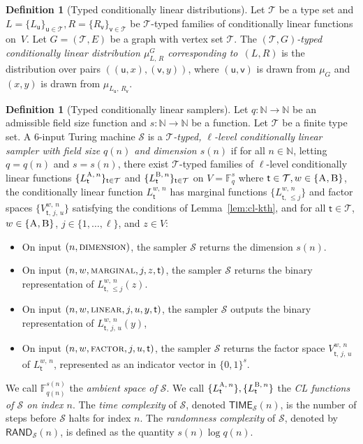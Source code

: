 \documentclass[11pt]{article}
\theoremstyle{definition}
\newtheorem{definition}[theorem]{Definition}
\newcommand{\N}{\ensuremath{\mathbb{N}}}
\newcommand{\F}{\ensuremath{\mathbb{F}}}
\newcommand{\sampler}{\mathcal{S}}
\newcommand{\type}{\mathcal{T}}
\newcommand{\gamestyle}[1]{\ensuremath{\textsc{#1}}\xspace}
\newcommand{\labelstyle}[1]{\ensuremath{\textsc{#1}}\xspace}
\newcommand{\tvarstyle}[1]{\mathsf{#1}}
\newcommand{\tvar}{\ensuremath{\tvarstyle{t}}}
\newcommand{\lvar}{\ensuremath{\tvarstyle{u}}}
\newcommand{\rvar}{\ensuremath{\tvarstyle{v}}}
\newcommand{\alice}{\labelstyle{A}}
\newcommand{\bob}{\labelstyle{B}}
\newcommand{\ab}{\{\alice, \bob\}}
\newcommand{\AB}{\{\alice, \bob\}}
\newcommand{\TIME}{\mathsf{TIME}}
\newcommand{\RAND}{\mathsf{RAND}}
\begin{document}
\begin{definition}[Typed conditionally linear distributions]
  Let $\type$ be a type set and
  $L=\{L_\lvar\}_{\lvar\in\type},R=\{R_\rvar\}_{\rvar\in\type}$ be $\type$-typed
  families of conditionally linear functions on~$V$.
  Let $G = (\type, E)$ be a graph with vertex set $\type$.
  The \emph{$(\type, G)$-typed conditionally linear distribution $\mu_{L,\,
      R}^G$ corresponding to~$(L, R)$} is the distribution over pairs $( (\lvar,
  x), (\rvar, y) )$, where $(\lvar, \rvar)$ is drawn from $\mu_G$ and $(x,y)$ is
  drawn from $\mu_{L_\lvar,\, R_\rvar}$.
\end{definition}

\begin{definition}[Typed conditionally linear samplers]
  \label{def:typed-sampler}
	Let $q:\N \to \N$ be an admissible field size function and $s: \N \to \N$ be a
  function.
  Let $\type$ be a finite type set.
  A $6$-input Turing machine $\sampler$ is a \emph{$\type$-typed, $\ell$-level
    conditionally linear sampler with field size $q(n)$ and dimension $s(n)$} if
  for all $n \in \N$, letting $q = q(n)$ and $s = s(n)$, there exist
  $\type$-typed families of $\ell$-level conditionally linear functions
  $\{L^{\alice,\, n}_{\tvar}\}_{\tvar \in \type}$ and $\{L^{\bob,\,
    n}_{\tvar}\}_{\tvar \in \type}$ on $V = \F_q^s$ where $\tvar \in \type, w\in
  \AB$, the conditionally linear function $L^{w,\, n}_{\tvar}$ has marginal
  functions $\{L^{w,\, n}_{\tvar,\, \leq j}\}$ and factor spaces $\{V^{w,\,
    n}_{\tvar,\, j,\, u}\}$ satisfying the conditions of Lemma~\ref{lem:cl-kth},
  and for all $\tvar \in \type$, $w \in \ab$, $j \in \{1, \ldots, \ell\}$, and
  $z \in V$:
  \begin{itemize}
  \item On input $(n, \gamestyle{dimension})$, the sampler $\sampler$ returns
    the dimension $s(n)$.
	
	\item On input $(n, w, \gamestyle{marginal}, j, z, \tvar)$, the sampler
    $\sampler$ returns the binary representation of $L^{w,\, n}_{\tvar,\, \le
      j}(z)$.
			
			\item On input $(n, w, \gamestyle{linear}, j, u, y, \tvar)$, the sampler $\sampler$
    outputs the binary representation of $L^{w,\, n}_{\tvar,\, j,\, u}(y)$,

	\item On input $(n, w, \gamestyle{factor}, j, u, \tvar)$, the sampler
    $\sampler$ returns the factor space $V^{w,\, n}_{\tvar,\, j,\, u}$ of
    $L^{w,\, n}_{\tvar}$, represented as an indicator vector in $\{0,1\}^s$.
  \end{itemize}
  We call $\F_{q(n)}^{s(n)}$ the \emph{ambient space of $\sampler$}.
  We call $\{ L^{\alice,\, n}_{\tvar} \}, \{ L^{\bob,\, n}_{\tvar} \}$ the
  \emph{CL functions of $\sampler$ on index $n$}.
  The \emph{time complexity} of $\sampler$, denoted $\TIME_\sampler(n)$, is the
  number of steps before $\sampler$ halts for index $n$.
  The \emph{randomness complexity} of $\sampler$, denoted by
  $\RAND_\sampler(n)$, is defined as the quantity $ s(n) \log q(n)$.
\end{definition}
\end{document}
